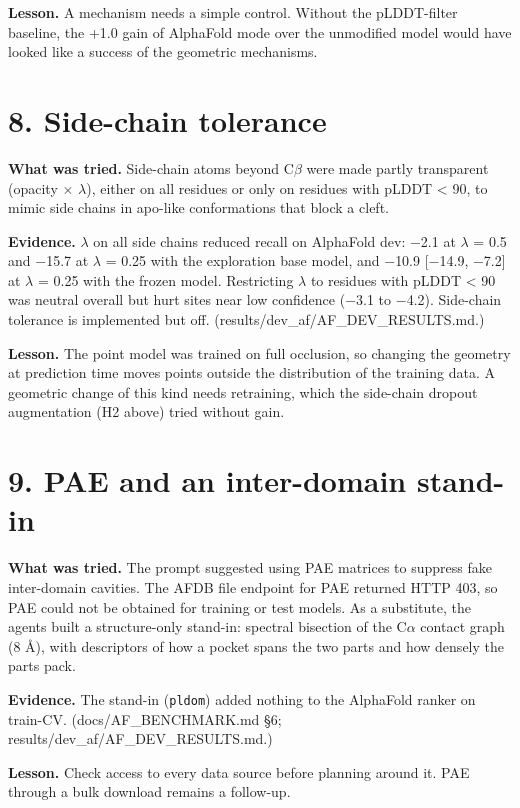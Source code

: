 \documentclass[10pt,letterpaper]{article}
\begin{document}
\textbf{Lesson.} A mechanism needs a simple control. Without the pLDDT-filter baseline, the +1.0 gain of AlphaFold mode over the unmodified model would have looked like a success of the geometric mechanisms.

\section*{8. Side-chain tolerance}

\textbf{What was tried.} Side-chain atoms beyond C$\beta$ were made partly transparent (opacity $\times$ $\lambda$), either on all residues or only on residues with pLDDT \textless{} 90, to mimic side chains in apo-like conformations that block a cleft.

\textbf{Evidence.} $\lambda$ on all side chains reduced recall on AlphaFold dev: $-$2.1 at $\lambda$ = 0.5 and $-$15.7 at $\lambda$ = 0.25 with the exploration base model, and $-$10.9 [$-$14.9, $-$7.2] at $\lambda$ = 0.25 with the frozen model. Restricting $\lambda$ to residues with pLDDT \textless{} 90 was neutral overall but hurt sites near low confidence ($-$3.1 to $-$4.2). Side-chain tolerance is implemented but off. (results/dev\_af/AF\_DEV\_RESULTS.md.)

\textbf{Lesson.} The point model was trained on full occlusion, so changing the geometry at prediction time moves points outside the distribution of the training data. A geometric change of this kind needs retraining, which the side-chain dropout augmentation (H2 above) tried without gain.

\section*{9. PAE and an inter-domain stand-in}

\textbf{What was tried.} The prompt suggested using PAE matrices to suppress fake inter-domain cavities. The AFDB file endpoint for PAE returned HTTP 403, so PAE could not be obtained for training or test models. As a substitute, the agents built a structure-only stand-in: spectral bisection of the C$\alpha$ contact graph (8 \AA{}), with descriptors of how a pocket spans the two parts and how densely the parts pack.

\textbf{Evidence.} The stand-in (\texttt{pldom}) added nothing to the AlphaFold ranker on train-CV. (docs/AF\_BENCHMARK.md §6; results/dev\_af/AF\_DEV\_RESULTS.md.)

\textbf{Lesson.} Check access to every data source before planning around it. PAE through a bulk download remains a follow-up.
\end{document}

